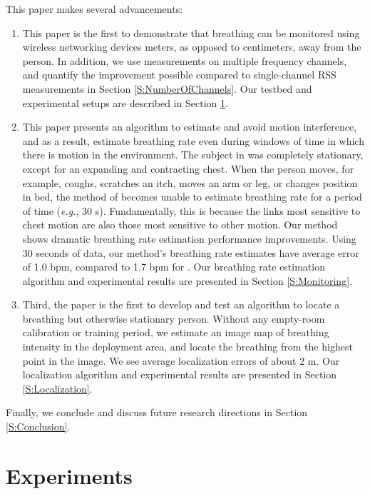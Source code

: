 \documentclass[10pt,journal,letterpaper]{IEEEtran}
\newcommand{\eg}{{\it e.g.}}
\begin{document}
This paper makes several advancements:
\begin{enumerate}
 \item This paper is the first to demonstrate that breathing can be monitored using wireless networking devices meters, as opposed to centimeters, away from the person.  In addition, we use measurements on multiple frequency channels, and quantify the improvement possible compared to single-channel RSS measurements in Section \ref{S:NumberOfChannels}.  Our testbed and experimental setups are described in Section \ref{S:Experiments}.  
 \item This paper presents an algorithm to estimate and avoid motion interference, and as a result, estimate breathing rate even during windows of time in which there is motion in the environment.  The subject in \cite{patwari11breathing} was completely stationary, except for an expanding and contracting chest.  When the person moves, for example, coughs, scratches an itch, moves an arm or leg, or changes position in bed, the method of \cite{patwari11breathing} becomes unable to estimate breathing rate for a period of time (\eg, 30 s). 
Fundamentally, this is because the links most sensitive to chest motion are also those most sensitive to other motion.  Our method shows dramatic breathing rate estimation performance improvements.  Using 30 seconds of data, our method's breathing rate estimates have average error of 1.0 bpm, compared to 1.7 bpm for \cite{patwari11breathing}.  Our breathing rate estimation algorithm and experimental results are presented in Section 
\ref{S:Monitoring}.
 \item Third, the paper is the first to develop and test an algorithm to locate a breathing but otherwise stationary person.  Without any empty-room calibration or training period, we estimate an image map of breathing intensity in the deployment area, and locate the breathing from the highest point in the image.  We see average localization errors of about 2 m. Our localization algorithm and experimental results are presented in Section \ref{S:Localization}.  
\end{enumerate}
Finally, we conclude and discuss future research directions in Section \ref{S:Conclusion}.










\section{Experiments} \label{S:Experiments}
\end{document}
